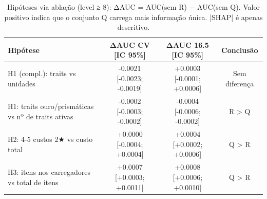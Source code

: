 \begin{table}[htbp]
\caption{Hipóteses via ablação (level ≥ 8): ΔAUC = AUC(sem R) − AUC(sem Q). Valor positivo indica que o conjunto Q carrega mais informação única. |SHAP| é apenas descritivo.}
\label{tab:hipoteses_lvl8}
\centering
\small
\begin{tabular}{lccc}
\toprule
Hipótese & ΔAUC CV [IC 95\%] & ΔAUC 16.5 [IC 95\%] & Conclusão \\
\midrule
H1 (compl.): traits vs unidades & -0.0021 [-0.0023; -0.0019] & +0.0003 [-0.0001; +0.0006] & Sem diferença \\
H1: traits ouro/prismáticas vs nº de traits ativas & -0.0002 [-0.0003; -0.0002] & -0.0004 [-0.0006; -0.0002] & R > Q \\
H2: 4-5 custos 2★ vs custo total & +0.0000 [-0.0004; +0.0004] & +0.0004 [+0.0002; +0.0006] & Q > R \\
H3: itens nos carregadores vs total de itens & +0.0007 [+0.0003; +0.0011] & +0.0008 [+0.0006; +0.0010] & Q > R \\
\bottomrule
\end{tabular}
\end{table}
